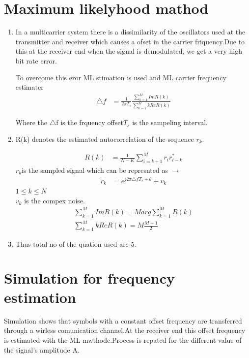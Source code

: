 \section{Maximum likelyhood mathod}
\begin{enumerate}
	\item In a multicarrier  system  there is a dissimilarity of the oscillators used at the transmitter and receiver which  causes a ofset in the carrier friquency.Due to this at the receiver end when the signal is demodulated, we get a very high bit rate error.
	
	To overcome this eror ML stimation is used and ML carrier frequency estimater 
	\begin{align}
	\triangle f &= \frac{1}{2\pi T_s}\frac{\sum_{k=1}^{M} Im{R(k)}}{\sum_{k=1}^{M} kRe{R(k)}}
	\end{align}
	
	Where the  $\triangle$f is the frquency  offset$T_s$ is the sampeling interval.
	
	\item R(k) denotes the estimated autocorrelation of the sequence $r_k$.
	
	\begin{align}
	R(k) &= \frac{1}{N-K}{\sum_{i = k+1}^{M} r_ir_{i-k}^*}	
	\end{align}
	$r_k $is the sampled signal which can be represnted as $\to$
	\begin{align}
	r_k &= e^{j2\pi \triangle fT_s + \theta}	+ v_k
	\end{align}
	$1\leq k \leq N$
	\\
	$v_k$ is the compex noise.
	\\
   \begin{align}
    \sum_{k=1}^{M} Im{R(k)} = M arg{\sum_{k=1}^{M} {R(k)}}
    \\
    \sum_{k=1}^{M} kRe{R(k)} = M\frac{M+1}{2}
	\end{align}
	\item Thus total no of the quation used are 5.
\end{enumerate}

\section{Simulation for frequency estimation}

	 Simulation shows that symbols with a constant offset frequency are transferred through a wirless comunication channel.At the receiver end this offset frequency is estimated with the ML mwthode.Process is repated for the different value of the signal's amplitude A.
	
